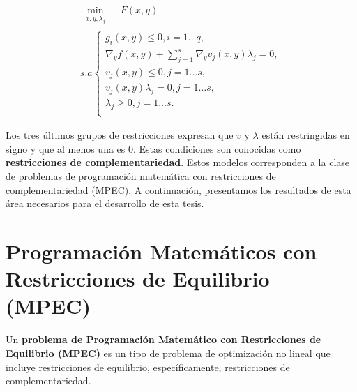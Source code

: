 % 
        \begin{equation}\label{eq:KKT_Optimista}   
            \begin{array}{l}
                \underset{\substack{x, y, \lambda_j}}{\min} \quad F(x, y)\\
                s.a \left\{ 
                \begin{array}{l}
                    g_i(x, y) \leq 0, i=1\ldots q,\\
                    \nabla_{y} f(x, y) + \sum_{j=1}^{s} \nabla_{y} v_j(x, y) \lambda_j = 0, \\
                    v_j(x, y) \leq 0, j=1\ldots s,\\
                    v_j(x, y)\lambda_j = 0, j=1\ldots s, \\
                    \lambda_j \geq 0, j=1\ldots s.\\
                \end{array}\right.
            \end{array}
        \end{equation}
     

Los tres últimos grupos de restricciones expresan que $v$ y $\lambda$ están restringidas en signo y que al menos una es 0. Estas condiciones son conocidas como \textbf{restricciones de complementariedad}. Estos modelos corresponden a la clase de problemas de programación matemática con restricciones de complementariedad (MPEC). 
A continuación, presentamos los resultados de esta área necesarios para el desarrollo de esta tesis.

\section{Programaci\' on Matemáticos con Restricciones de Equilibrio (MPEC)}
Un \textbf{problema de Programaci\'on Matemático con Restricciones de Equilibrio (MPEC)} es un tipo de  problema de optimizaci\'on no lineal que incluye restricciones de equilibrio, específicamente, restricciones de complementariedad.

